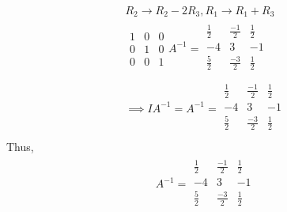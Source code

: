 \documentclass{article}
\begin{document}
\begin{gather*}
R_2 \rightarrow R_2 - 2R_3, R_1 \rightarrow R_1 + R_3\\
\begin{matrix}
1 & 0 & 0\\
0 & 1 & 0\\
0 & 0 & 1
\end{matrix} A^{-1} = \begin{matrix}
\frac{1}{2} & \frac{-1}{2} & \frac{1}{2}\\
-4 & 3 & -1\\
\frac{5}{2} & \frac{-3}{2} & \frac{1}{2}\\
\end{matrix}\\
\implies IA^{-1} = A^{-1} =  \begin{matrix}
\frac{1}{2} & \frac{-1}{2} & \frac{1}{2}\\
-4 & 3 & -1\\
\frac{5}{2} & \frac{-3}{2} & \frac{1}{2}\\
\end{matrix}
\end{gather*}
Thus,
\begin{gather*}
     A^{-1} =  \begin{matrix}
\frac{1}{2} & \frac{-1}{2} & \frac{1}{2}\\
-4 & 3 & -1\\
\frac{5}{2} & \frac{-3}{2} & \frac{1}{2}\\
\end{matrix}
\end{gather*}
\end{document}
